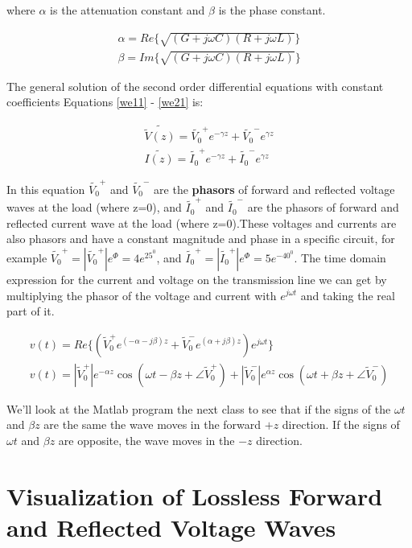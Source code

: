 \documentclass{ximera}
\begin{document}
where $\alpha$ is the attenuation constant and $\beta$ is the phase
constant.

\begin{eqnarray}
\alpha=Re\{ \sqrt{(G+j\omega C)  (R+j\omega L)  }  \} \nonumber \\ \nonumber
\beta = Im\{ \sqrt{(G+j\omega C)  (R+j\omega L)  }  \}
\end{eqnarray}

The general solution of the second order differential equations with constant coefficients
Equations \ref{we11} - \ref{we21}   is:

\begin{eqnarray}
\tilde{\tilde{V}(z)}=\tilde{V_0}^+ e^{-\gamma z} + \tilde{V_0}^- e^{\gamma z} \nonumber \\ \nonumber
\tilde{I(z)}=\tilde{I_0}^+ e^{-\gamma z} + \tilde{I_0}^- e^{\gamma z}
\end{eqnarray}

In this equation $\tilde{V_0}^+$ and $\tilde{V_0}^-$ are the {\bf
phasors} of forward and
reflected voltage waves at the load (where z=0), and $\tilde{I_0}^+$ and $\tilde{I_0}^-$ are the phasors of forward and
reflected  current wave at the load (where z=0).These voltages and currents are also phasors and have a constant magnitude and phase in a specific circuit, for example $\tilde{V_0}^+=|\tilde{V_0}^+| e^\Phi=4e^{25^0}$, and $\tilde{I_0}^+=|\tilde{I_0}^+| e^\Phi=5e^{-40^0}$.
The time domain expression for the current and voltage on the
transmission line we can get by multiplying the phasor of the voltage and current with $e^{j \omega t}$ and taking the real part of it.

\begin{eqnarray}
v(t)=Re\{ (\tilde{V}_0^+  e^{(-\alpha - j \beta) z} + \tilde{V}_0^- e^{(\alpha + j
 \beta) z})e^{j \omega t} \}  \nonumber \\ 
v(t)=|\tilde{V}_0^+| e^{ - \alpha z} \cos(\omega t - \beta z + \angle \tilde{V}_0^+)+
|\tilde{V}_0^-|e^{\alpha z} \cos(\omega t + \beta z + \angle \tilde{V}_0^-) \label{tdeq}
\end{eqnarray}

We'll look at the Matlab program the next class to see that if the signs of the $\omega t$ and
$\beta z$ are the same the wave moves in the forward $+z$
direction. If the signs of $\omega t$ and $\beta z$ are opposite, the
wave moves in the $-z$ direction.



\section{Visualization of Lossless Forward and Reflected Voltage Waves}
\end{document}
